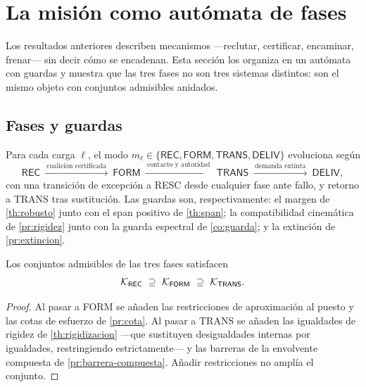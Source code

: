 \section{La misión como autómata de fases}
\label{sec:mision}

Los resultados anteriores describen mecanismos —reclutar, certificar, encaminar,
frenar— sin decir cómo se encadenan. Esta sección los organiza en un autómata
con guardas y muestra que las tres fases no son tres sistemas distintos: son el
mismo objeto con conjuntos admisibles anidados.

\subsection{Fases y guardas}

\begin{definicion}
\label{def:automata}
Para cada carga $\ell$, el modo
$m_\ell\in\{\textsf{REC},\textsf{FORM},\textsf{TRANS},\textsf{DELIV}\}$ evoluciona
según
\[
  \textsf{REC}\ \xrightarrow{\ \text{coalición certificada}\ }\ \textsf{FORM}
  \ \xrightarrow{\ \text{contacto y autoridad}\ }\ \textsf{TRANS}
  \ \xrightarrow{\ \text{demanda extinta}\ }\ \textsf{DELIV},
\]
con una transición de excepción a \textsf{RESC} desde cualquier fase ante fallo,
y retorno a \textsf{TRANS} tras sustitución. Las guardas son, respectivamente:
el margen de \cref{th:robusto} junto con el span positivo de \cref{th:span};
la compatibilidad cinemática de \cref{pr:rigidez} junto con la guarda espectral
de \cref{co:guarda}; y la extinción de \cref{pr:extincion}.
\end{definicion}

\figAutomata

\begin{proposicion}
\label{pr:anidados}
Los conjuntos admisibles de las tres fases satisfacen
\[
  \Kcal_{\textsf{REC}}\ \supseteq\ \Kcal_{\textsf{FORM}}\ \supseteq\ \Kcal_{\textsf{TRANS}} .
\]
\end{proposicion}

\begin{proof}
Al pasar a \textsf{FORM} se añaden las restricciones de aproximación al puesto y
las cotas de esfuerzo de \cref{pr:cota}. Al pasar a \textsf{TRANS} se añaden las
igualdades de rigidez de \cref{th:rigidizacion} —que sustituyen desigualdades
internas por igualdades, restringiendo estrictamente— y las barreras de la
envolvente compuesta de \cref{pr:barrera-compuesta}. Añadir restricciones no
amplía el conjunto.
\end{proof}

